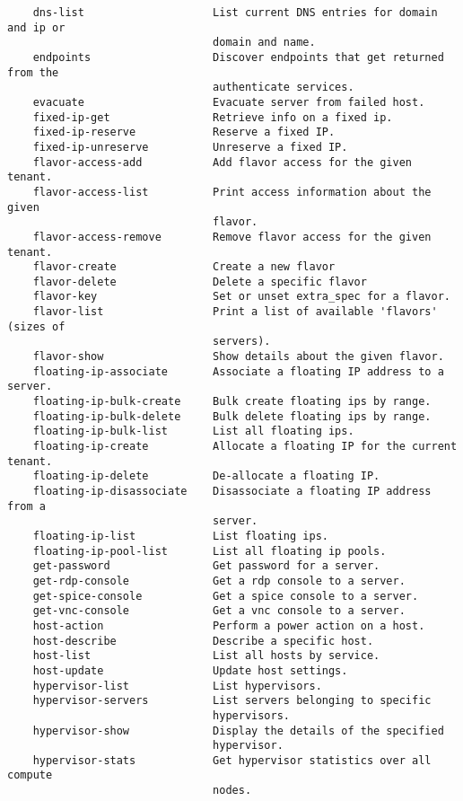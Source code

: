 \documentclass[a4paper,left=1.5cm,right=1.5cm,11pt]{article}
\begin{document}
\begin{lstlisting}
    dns-list                    List current DNS entries for domain and ip or
                                domain and name.
    endpoints                   Discover endpoints that get returned from the
                                authenticate services.
    evacuate                    Evacuate server from failed host.
    fixed-ip-get                Retrieve info on a fixed ip.
    fixed-ip-reserve            Reserve a fixed IP.
    fixed-ip-unreserve          Unreserve a fixed IP.
    flavor-access-add           Add flavor access for the given tenant.
    flavor-access-list          Print access information about the given
                                flavor.
    flavor-access-remove        Remove flavor access for the given tenant.
    flavor-create               Create a new flavor
    flavor-delete               Delete a specific flavor
    flavor-key                  Set or unset extra_spec for a flavor.
    flavor-list                 Print a list of available 'flavors' (sizes of
                                servers).
    flavor-show                 Show details about the given flavor.
    floating-ip-associate       Associate a floating IP address to a server.
    floating-ip-bulk-create     Bulk create floating ips by range.
    floating-ip-bulk-delete     Bulk delete floating ips by range.
    floating-ip-bulk-list       List all floating ips.
    floating-ip-create          Allocate a floating IP for the current tenant.
    floating-ip-delete          De-allocate a floating IP.
    floating-ip-disassociate    Disassociate a floating IP address from a
                                server.
    floating-ip-list            List floating ips.
    floating-ip-pool-list       List all floating ip pools.
    get-password                Get password for a server.
    get-rdp-console             Get a rdp console to a server.
    get-spice-console           Get a spice console to a server.
    get-vnc-console             Get a vnc console to a server.
    host-action                 Perform a power action on a host.
    host-describe               Describe a specific host.
    host-list                   List all hosts by service.
    host-update                 Update host settings.
    hypervisor-list             List hypervisors.
    hypervisor-servers          List servers belonging to specific
                                hypervisors.
    hypervisor-show             Display the details of the specified
                                hypervisor.
    hypervisor-stats            Get hypervisor statistics over all compute
                                nodes.

\end{lstlisting}
\end{document}
